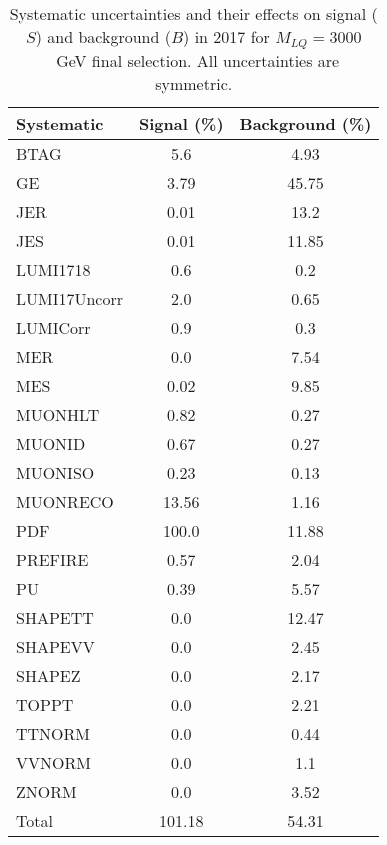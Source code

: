 \begin{table}[htbp]
\begin{center}
\caption{Systematic uncertainties and their effects on signal ($S$) and background ($B$) in 2017 for $M_{LQ}=3000$~GeV final selection. All uncertainties are symmetric.}
\begin{tabular}{lcc}
\hline\hline
Systematic & Signal (\%) & Background (\%) \\ \hline 
BTAG & 5.6 & 4.93\\ 
GE & 3.79 & 45.75\\ 
JER & 0.01 & 13.2\\ 
JES & 0.01 & 11.85\\ 
LUMI1718 & 0.6 & 0.2\\ 
LUMI17Uncorr & 2.0 & 0.65\\ 
LUMICorr & 0.9 & 0.3\\ 
MER & 0.0 & 7.54\\ 
MES & 0.02 & 9.85\\ 
MUONHLT & 0.82 & 0.27\\ 
MUONID & 0.67 & 0.27\\ 
MUONISO & 0.23 & 0.13\\ 
MUONRECO & 13.56 & 1.16\\ 
PDF & 100.0 & 11.88\\ 
PREFIRE & 0.57 & 2.04\\ 
PU & 0.39 & 5.57\\ 
SHAPETT & 0.0 & 12.47\\ 
SHAPEVV & 0.0 & 2.45\\ 
SHAPEZ & 0.0 & 2.17\\ 
TOPPT & 0.0 & 2.21\\ 
TTNORM & 0.0 & 0.44\\ 
VVNORM & 0.0 & 1.1\\ 
ZNORM & 0.0 & 3.52\\ 
Total & 101.18 & 54.31\\ \hline \hline
\end{tabular}
\label{tab:SysUncertainties_uujj_3000}
\end{center}
\end{table}

